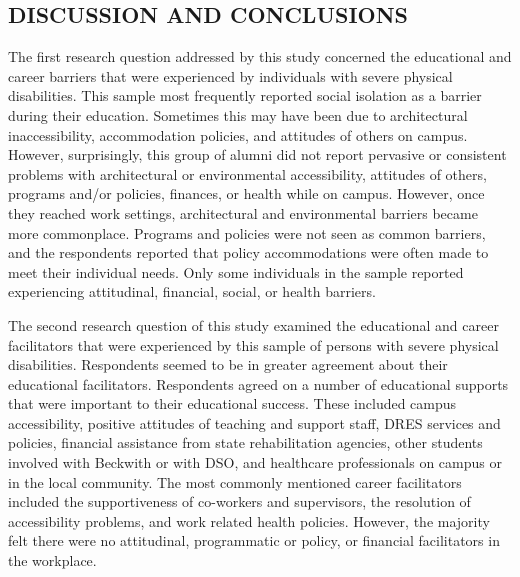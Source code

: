 \documentclass[11.5pt]{sig-alternate} %
\begin{document}
\begin{large}
\section*{DISCUSSION AND CONCLUSIONS}
The first research question addressed by this study concerned the educational and career barriers that were experienced by individuals with severe physical disabilities. This sample most frequently reported social isolation as a barrier during their education. Sometimes this may have been due to architectural inaccessibility, accommodation policies, and attitudes of others on campus. However, surprisingly, this group of alumni did not report pervasive or consistent problems with architectural or environmental accessibility, attitudes of others, programs and/or policies, finances, or health while on campus. However, once they reached work settings, architectural and environmental barriers became more commonplace. Programs and policies were not seen as common barriers, and the respondents reported that policy accommodations were often made to meet their individual needs. Only some individuals in the sample reported experiencing attitudinal, financial, social, or health barriers.

The second research question of this study examined the educational and career facilitators that were experienced by this sample of persons with severe physical disabilities. Respondents seemed to be in greater agreement about their educational facilitators. Respondents agreed on a number of educational supports that were important to their educational success. These included campus accessibility, positive attitudes of teaching and support staff, DRES services and policies, financial assistance from state rehabilitation agencies, other students involved with Beckwith or with DSO, and healthcare professionals on campus or in the local community. The most commonly mentioned career facilitators included the supportiveness of co-workers and supervisors, the resolution of accessibility problems, and work related health policies. However, the majority felt there were no attitudinal, programmatic or policy, or financial facilitators in the workplace. 


\end{large}
\end{document}
